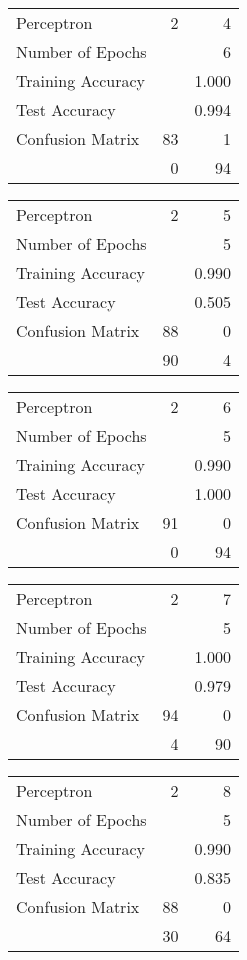 \documentclass[11pt]{article}
\begin{document}
\begin{minipage}[t]{0.5\textwidth}
\begin{tabular}{|l | r r|}
\hline Perceptron & 2 & 4\\
Number of Epochs & & 6\\
Training Accuracy & & 1.000\\
Test Accuracy & & 0.994\\
Confusion Matrix & 83 & 1\\
 &0 & 94\\ \hline
\end{tabular}
\end{minipage}
\begin{minipage}[t]{0.5\textwidth}
\begin{tabular}{|l | r r|}
\hline Perceptron & 2 & 5\\
Number of Epochs & & 5\\
Training Accuracy & & 0.990\\
Test Accuracy & & 0.505\\
Confusion Matrix & 88 & 0\\
 &90 & 4\\ \hline
\end{tabular}
\end{minipage}
\begin{minipage}[t]{0.5\textwidth}
\begin{tabular}{|l | r r|}
\hline Perceptron & 2 & 6\\
Number of Epochs & & 5\\
Training Accuracy & & 0.990\\
Test Accuracy & & 1.000\\
Confusion Matrix & 91 & 0\\
 &0 & 94\\ \hline
\end{tabular}
\end{minipage}
\begin{minipage}[t]{0.5\textwidth}
\begin{tabular}{|l | r r|}
\hline Perceptron & 2 & 7\\
Number of Epochs & & 5\\
Training Accuracy & & 1.000\\
Test Accuracy & & 0.979\\
Confusion Matrix & 94 & 0\\
 &4 & 90\\ \hline
\end{tabular}
\end{minipage}
\begin{minipage}[t]{0.5\textwidth}
\begin{tabular}{|l | r r|}
\hline Perceptron & 2 & 8\\
Number of Epochs & & 5\\
Training Accuracy & & 0.990\\
Test Accuracy & & 0.835\\
Confusion Matrix & 88 & 0\\
 &30 & 64\\ \hline
\end{tabular}
\end{minipage}
\end{document}
